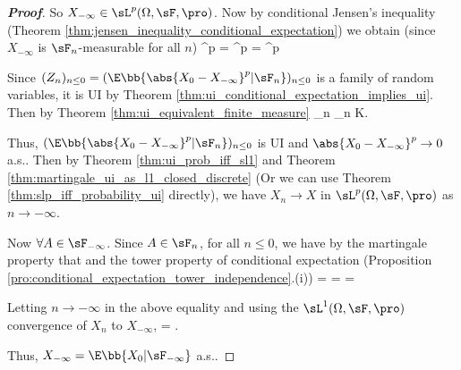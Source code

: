 \begin{proof}[\bf Proof]
So $X_{-\infty} \in \sL^p(\Omega,\sF,\pro)$. Now by conditional Jensen's inequality (Theorem \ref{thm:jensen_inequality_conditional_expectation}) we obtain (since $X_{-\infty}$ is $\sF_n$-measurable for all $n$)
\be
{}^p = ^p = ^p \leq \E{}
\ee

Since $(Z_n)_{n\leq 0} = (\E\bb{\abs{X_0- X_{-\infty}}^p|\sF_n})_{n\leq 0}$ is a family of random variables, it is UI by Theorem \ref{thm:ui_conditional_expectation_implies_ui}. Then by Theorem \ref{thm:ui_equivalent_finite_measure}
\be
\sup_{n} \E{} \leq \sup_{n} \E{}  K\to \infty.
\ee

Thus, $(\E\bb{\abs{X_0- X_{-\infty}}^p|\sF_n})_{n\leq 0}$ is UI and $\abs{X_0- X_{-\infty}}^p \to 0$ a.s.. Then by Theorem \ref{thm:ui_prob_iff_sl1} and Theorem \ref{thm:martingale_ui_as_l1_closed_discrete} (Or we can use Theorem \ref{thm:slp_iff_probability_ui} directly), we have $X_n \to X$ in $\sL^p(\Omega,\sF,\pro)$ as $n \to -\infty$.

Now $\forall A \in \sF_{-\infty}$. Since $A \in \sF_n$, for all $n \leq 0$, we have by the martingale property that and the tower property of conditional expectation (Proposition \ref{pro:conditional_expectation_tower_independence}.(i))
\be
\E{} = \E{} = \E{} = \E{}
\ee

Letting $n \to -\infty$ in the above equality and using the $\sL^1(\Omega,\sF,\pro)$ convergence of $X_n$ to $X_{-\infty}$,
\be
\E{} = \E{} \to \E{}.
\ee

Thus, $X_{-\infty} = \E\bb{X_0|\sF_{-\infty}}$ a.s..
\end{proof}





